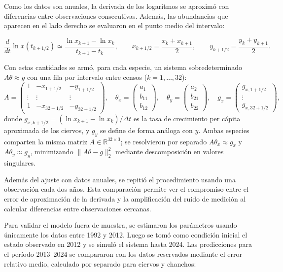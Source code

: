 \documentclass[11pt,a4paper]{article}
\begin{document}
Como los datos son anuales, la derivada de los logaritmos se aproximó con diferencias entre observaciones consecutivas. Además, las abundancias que aparecen en el lado derecho se evaluaron en el punto medio del intervalo:

\[
\frac{d}{dt}\ln x(t_{k+1/2})
\simeq
\frac{\ln x_{k+1}-\ln x_k}{t_{k+1}-t_k},
\qquad
x_{k+1/2}=\frac{x_k+x_{k+1}}{2},
\qquad
y_{k+1/2}=\frac{y_k+y_{k+1}}{2}.
\]

Con estas cantidades se armó, para cada especie, un sistema sobredeterminado
$A\theta\approx g$ con una fila por intervalo entre censos ($k=1,\dots,32$):
\[
A=\begin{pmatrix}
1 & -x_{1+1/2} & -y_{1+1/2}\\
\vdots & \vdots & \vdots\\
1 & -x_{32+1/2} & -y_{32+1/2}
\end{pmatrix},\quad
\theta_x=\begin{pmatrix}a_1\\ b_{11}\\ b_{12}\end{pmatrix},\quad
\theta_y=\begin{pmatrix}a_2\\ b_{21}\\ b_{22}\end{pmatrix},\quad
g_x=\begin{pmatrix}g_{x,1+1/2}\\ \vdots\\ g_{x,32+1/2}\end{pmatrix},
\]
donde $g_{x,k+1/2}=(\ln x_{k+1}-\ln x_k)/\Delta t$ es la tasa de crecimiento
per cápita aproximada de los ciervos, y $g_y$ se define de forma análoga con
$y$. Ambas especies comparten la misma matriz $A\in\mathbb{R}^{32\times3}$;
se resolvieron por separado $A\theta_x\approx g_x$ y $A\theta_y\approx g_y$,
minimizando $\|A\theta-g\|_2^2$ mediante descomposición en valores
singulares.


Además del ajuste con datos anuales, se repitió el procedimiento usando una observación cada dos años. Esta comparación permite ver el compromiso entre el error de aproximación de la derivada y la amplificación del ruido de medición al calcular diferencias entre observaciones cercanas.

Para validar el modelo fuera de muestra, se estimaron los parámetros usando únicamente los datos entre 1992 y 2012. Luego se tomó como condición inicial el estado observado en 2012 y se simuló el sistema hasta 2024. Las predicciones para el período 2013--2024 se compararon con los datos reservados mediante el error relativo medio, calculado por separado para ciervos y chanchos:
\end{document}
